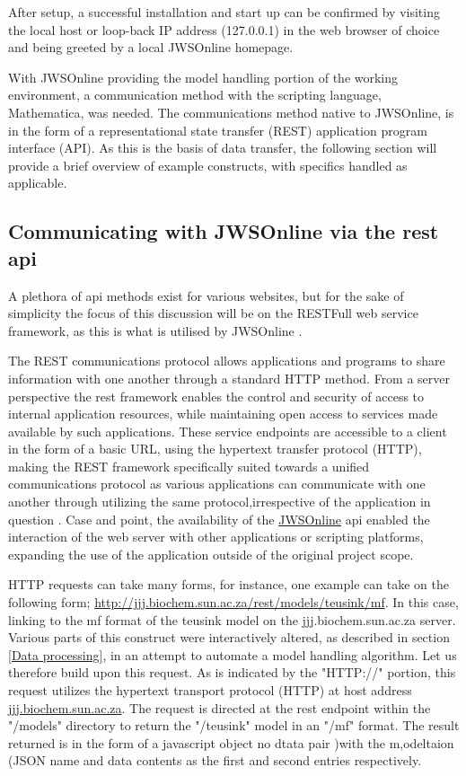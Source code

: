 After setup, a successful installation and start up can be confirmed by visiting the local host or loop-back IP address (127.0.0.1) in the web browser of choice and being greeted by a local JWSOnline homepage.

With JWSOnline providing the model handling portion of the working environment, a communication method with the scripting language, Mathematica, was needed. The communications method native to JWSOnline, is in the form of a representational state transfer (REST) application program interface (API). As this is the basis of data transfer, the following section will provide a brief overview of example constructs, with specifics handled as applicable. 

\subsection{Communicating with JWSOnline via the \gls{rest} \gls{api}} \label{REST Communication}
A plethora of \gls{api} methods exist for various websites, but for the sake of simplicity the focus of this discussion will be on the RESTFull web service framework, as this is what is utilised by JWSOnline \cite{rest2018}.

The REST communications protocol allows applications and programs to share information with one another through a standard HTTP method. From a server perspective the \gls{rest} framework enables the control and security of access to internal application resources, while maintaining open access to services made available by such applications. These service endpoints are accessible to a client in the form of a basic URL, using the hypertext transfer protocol (HTTP), making the REST framework specifically suited towards a unified communications protocol as various applications can communicate with one another through utilizing the same protocol,irrespective of the application in question \cite{rest2018}. Case and point, the availability of the \href{http://jjj.biochem.sun.ac.za}{JWSOnline} \gls{api} enabled the interaction of the web server with other applications or scripting platforms, expanding the use of the application outside of the original project scope. 

HTTP requests can take many forms, for instance, one example can take on the following form; \href{http://jjj.biochem.sun.ac.za/rest/models/teusink/mf}{http://jjj.biochem.sun.ac.za/rest/models/teusink/mf}. In this case, linking to the mf format of the teusink model on the jjj.biochem.sun.ac.za server. Various parts of this construct were interactively altered, as described in section \ref{Data processing}, in an attempt to automate a model handling algorithm. Let us therefore build upon this request. As is indicated by the "HTTP://" portion, this request utilizes the hypertext transport protocol (HTTP) at host address \href{jjj.biochem.sun.ac.za}{jjj.biochem.sun.ac.za}. The request is directed at the \gls{rest} endpoint within the "/models" directory to return the "/teusink" model in an "/mf" format. The result returned is in the form of a javascript object no dtata pair )with the m,odeltaion (JSON name and data contents as the first and second entries respectively.

